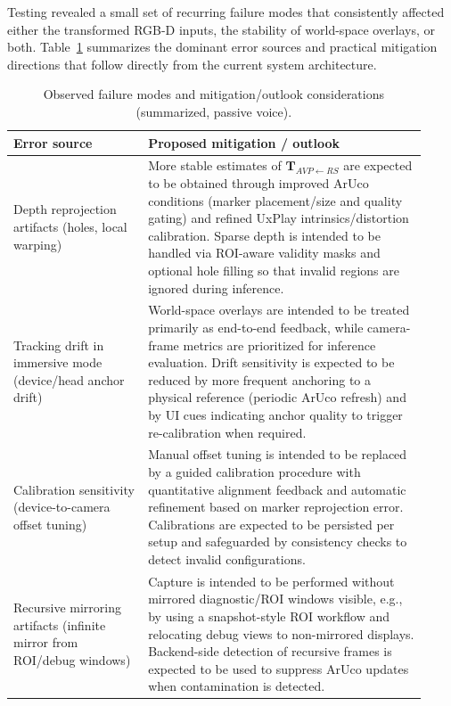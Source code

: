 Testing revealed a small set of recurring failure modes that consistently affected either the transformed RGB-D inputs, the stability of world-space overlays, or both. Table~\ref{tab:failure_modes} summarizes the dominant error sources and practical mitigation directions that follow directly from the current system architecture.
\begin{table}[H]
\centering
\caption{Observed failure modes and mitigation/outlook considerations (summarized, passive voice).}
\label{tab:failure_modes}
\begin{tabular}{p{0.30\linewidth}p{0.62\linewidth}}
\toprule
\textbf{Error source} & \textbf{Proposed mitigation / outlook} \\
\midrule
Depth reprojection artifacts (holes, local warping) &
More stable estimates of $\mathbf{T}_{AVP \leftarrow RS}$ are expected to be obtained through improved ArUco conditions (marker placement/size and quality gating) and refined UxPlay intrinsics/distortion calibration. Sparse depth is intended to be handled via ROI-aware validity masks and optional hole filling so that invalid regions are ignored during inference. \\
\midrule
Tracking drift in immersive mode (device/head anchor drift) &
World-space overlays are intended to be treated primarily as end-to-end feedback, while camera-frame metrics are prioritized for inference evaluation. Drift sensitivity is expected to be reduced by more frequent anchoring to a physical reference (periodic ArUco refresh) and by UI cues indicating anchor quality to trigger re-calibration when required. \\
\midrule
Calibration sensitivity (device-to-camera offset tuning) &
Manual offset tuning is intended to be replaced by a guided calibration procedure with quantitative alignment feedback and automatic refinement based on marker reprojection error. Calibrations are expected to be persisted per setup and safeguarded by consistency checks to detect invalid configurations. \\
\midrule
Recursive mirroring artifacts (infinite mirror from ROI/debug windows) &
Capture is intended to be performed without mirrored diagnostic/ROI windows visible, e.g., by using a snapshot-style ROI workflow and relocating debug views to non-mirrored displays. Backend-side detection of recursive frames is expected to be used to suppress ArUco updates when contamination is detected. \\
\bottomrule
\end{tabular}
\end{table}
